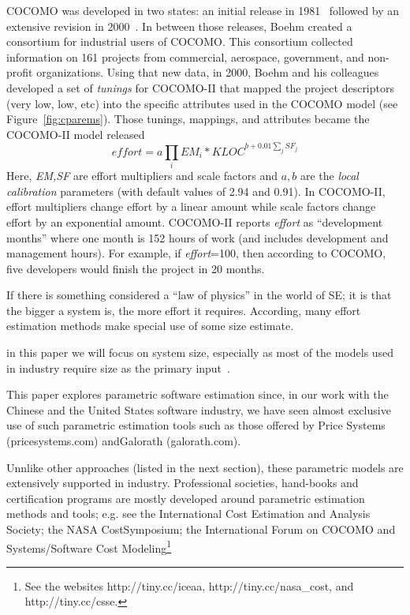 \documentclass[final,twocolumn,5p]{elsarticle}
\newcommand{\fig}[1]{Figure~\ref{fig:#1}}
\begin{document}
  COCOMO was developed in two states: an initial release in 1981~\cite{boehm81}
  followed by an extensive revision in  2000~\cite{boehm00b}.
  In between those releases,
  Boehm created a consortium for
industrial users of COCOMO.
This consortium
collected information on 161 projects from commercial,
aerospace, government, and non-profit organizations.
Using that new data, in 2000, Boehm and his colleagues developed
a set of   {\em tunings} for COCOMO-II that
mapped the project descriptors (very low, low, etc)
into the specific attributes used in the COCOMO model (see \fig{cparems}).
Those tunings, mappings, and attributes became the COCOMO-II model
released 
\begin{equation}\label{eq:cocII}
\mathit{effort}=a\prod_i EM_i *\mathit{KLOC}^{b+0.01\sum_j SF_j}
\end{equation}
Here, {\em EM,SF} are  effort multipliers and scale
factors and
 $a,b$ are the {\em local calibration} parameters (with default values of 2.94 and 0.91).
 In COCOMO-II, effort multipliers change effort by a linear amount
 while scale factors change effort by an exponential amount.
COCOMO-II reports {\em effort}
as ``development months'' where one month
is 152 hours of work  (and includes development and management hours).
For example, if {\em effort}=100, then according to COCOMO,
five developers would finish
the project in 20 months.


If there is something considered a ``law of
physics'' in the world of SE; it is that the bigger
a system is, the more effort it requires.
According, many effort estimation methods make special use of some size estimate.


in this paper we will focus on system size,
especially as most of the models used in industry
require size as the primary input~\cite{Boehm2000a}. 

This paper explores
 parametric software estimation since,
 in our work with the Chinese and the United States software industry, we have seen  almost  exclusive  use  of  such  parametric  estimation  tools such as those offered by Price Systems (pricesystems.com) andGalorath  (galorath.com).   
 
 Unnlike other approaches (listed in the next section),
 these parametric models are extensively supported
 in industry.
 Professional  societies,  hand-books and certification programs are mostly developed around parametric estimation methods and tools; e.g.  see the International Cost Estimation and Analysis Society;  the NASA CostSymposium;  the International Forum on COCOMO and Systems/Software Cost Modeling\footnote{
See the websites http://tiny.cc/iceaa, http://tiny.cc/nasa\_cost, and http://tiny.cc/csse.}
\end{document}
